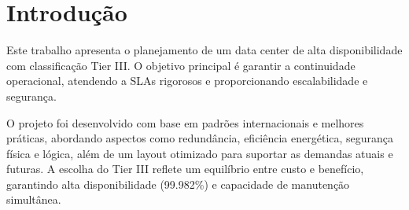 \documentclass[
	12pt,				%
	oneside,			%
	a4paper,			%
	english,			%
	brazil				%
	]{abntex2unama}
\begin{document}
\frenchspacing


%
% 
%
\imprimircapa

\tableofcontents*
\cleardoublepage



\textual



% 
%
%
\chapter{Introdução}
Este trabalho apresenta o planejamento de um data center de alta disponibilidade com classificação Tier III. O objetivo principal é garantir a continuidade operacional, atendendo a SLAs rigorosos e proporcionando escalabilidade e segurança.

O projeto foi desenvolvido com base em padrões internacionais e melhores práticas, abordando aspectos como redundância, eficiência energética, segurança física e lógica, além de um layout otimizado para suportar as demandas atuais e futuras. A escolha do Tier III reflete um equilíbrio entre custo e benefício, garantindo alta disponibilidade (99.982\%) e capacidade de manutenção simultânea.
\end{document}
